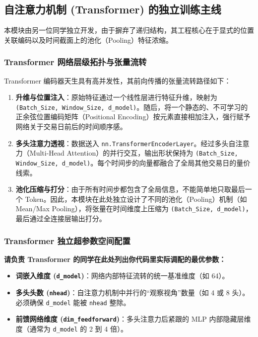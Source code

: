 \documentclass[9pt,a4paper,twoside]{rho-class/rho}
\begin{document}
    \subsection{自注意力机制 (Transformer) 的独立训练主线}
    本模块由另一位同学独立开发，由于摒弃了递归结构，其工程核心在于显式的位置关联编码以及时间截面上的池化（Pooling）特征浓缩。
    
    \subsubsection{Transformer 网络层级拓扑与张量流转}
    Transformer 编码器天生具有高并发性，其前向传播的张量流转路径如下：
    \begin{enumerate}
        \item \textbf{升维与位置注入}：原始特征通过一个线性层进行特征升维，映射为 \texttt{(Batch\_Size, Window\_Size, d\_model)}。随后，将一个静态的、不可学习的正余弦位置编码矩阵（Positional Encoding）按元素直接相加注入，强行赋予网络关于交易日前后的时间顺序感。
        \item \textbf{多头注意力透视}：数据送入 \texttt{nn.TransformerEncoderLayer}。经过多头自注意力（Multi-Head Attention）的并行交互，输出形状保持为 \texttt{(Batch\_Size, Window\_Size, d\_model)}。每个时间步的向量都融合了全局其他交易日的量价线索。
        \item \textbf{池化压缩与打分}：由于所有时间步都包含了全局信息，不能简单地只取最后一个 Token。因此，本模块在此处独立设计了不同的池化（Pooling）机制（如 Mean/Max Pooling），将张量在时间维度上压缩为 \texttt{(Batch\_Size, d\_model)}，最后通过全连接层输出打分。
    \end{enumerate}

    \subsubsection{Transformer 独立超参数空间配置}
    \begin{rhoenv}[frametitle=填写建议：Transformer 独有超参数]
    \textbf{请负责 Transformer 的同学在此处列出你代码里实际调配的最优参数：}
    \begin{itemize}
        \item \textbf{词嵌入维度 (\texttt{d\_model})}：网络内部特征流转的统一基准维度（如 64）。
        \item \textbf{多头头数 (\texttt{nhead})}：自注意力机制中并行的“观察视角”数量（如 4 或 8 头）。必须确保 \texttt{d\_model} 能被 \texttt{nhead} 整除。
        \item \textbf{前馈网络维度 (\texttt{dim\_feedforward})}：多头注意力后紧跟的 MLP 内部隐藏层维度（通常为 \texttt{d\_model} 的 2 到 4 倍）。
    \end{itemize}
    \end{rhoenv}
\end{document}
